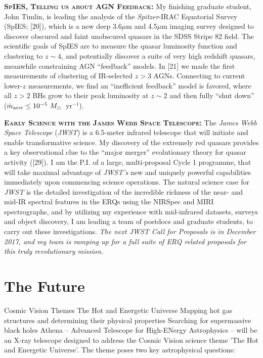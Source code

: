 \documentclass[oneside, a4paper, onecolumn, 11pt]{article}
\begin{document}
\smallskip \smallskip
\smallskip
\smallskip
\noindent
\textbf{\textsc{SpIES, Telling us about AGN Feedback:}}
My finishing graduate student, John Timlin, is leading the analysis of the {\it
Spitzer}-IRAC Equatorial Survey (SpIES; [20]), which is a new deep
3.6$\mu$m and 4.5$\mu$m imaging survey designed to discover obscured
and faint unobscured quasars in the SDSS Stripe 82 field. The
scientific goals of SpIES are to measure the quasar luminosity
function and clustering to $z\sim4$, and potentially discover a suite
of very high redshift quasars, meanwhile constraining AGN ``feedback''
models.  In [21] we made the first measurements of clustering of
IR-selected $z > 3$ AGNs.  Connecting to current lower-$z$
measurements, we find an ``inefficient feedback'' model is favored,
where all $z>2$ BHs grow to their peak luminosity at $z\sim2$ and then
fully ``shut down'' ($\dot{m}_{\rm accr} \leq 10^{-5}~M_{\odot}$~yr$^{-1}$).

\smallskip \smallskip
\smallskip \smallskip
\noindent
\textbf{\textsc{Early Science with the James Webb Space Telescope: }}
The {\it James Webb Space Telescope} ({\it JWST}) is a 6.5-meter
infrared telescope that will initiate and enable transformative
science. My discovery of the extremely red quasars provides a key
observational clue to the ``major merger'' evolutionary theory for
quasar activity ([29]). I am the P.I. of a large, multi-proposal Cycle 1
programme, that will take maximal advantage of {\it JWST's} new and
uniquely powerful capabilities immediately upon commencing science
operations. The natural science case for {\it JWST} is the detailed
investigation of the incredible richness of the near- and mid-IR spectral
features in the ERQs using the NIRSpec and MIRI spectrographs, and by
utilizing my experience with mid-infrared datasets, surveys and object
discovery, I am leading a team of postdocs and graduate students, to
carry out these investigations. {\it The next JWST Call for Proposals
is in December 2017, and my team is ramping up for a full suite of ERQ
related proposals for this truly revolutionary mission}.


\section{The Future}
Cosmic Vision Themes	The Hot and Energetic Universe
Mapping hot gas structures and determining their physical properties
Searching for supermassive black holes
Athena – Advanced Telescope for High-ENergy Astrophysics – will be an X-ray telescope designed to address the Cosmic Vision science theme 'The Hot and Energetic Universe'. The theme poses two key astrophysical questions:
\end{document}
